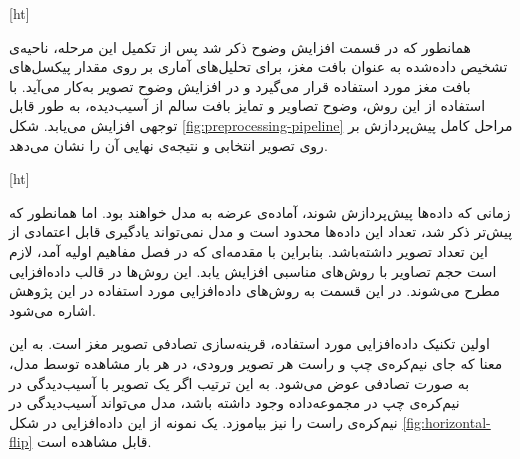 [ht]

همانطور که در قسمت افزایش وضوح ذکر شد پس از تکمیل این مرحله، ناحیه‌ی تشخیص داده‌شده به عنوان بافت مغز، برای تحلیل‌های آماری بر روی مقدار پیکسل‌های بافت مغز مورد استفاده قرار می‌گیرد و در افزایش وضوح تصویر به‌کار می‌آید.
با استفاده از این روش، وضوح تصاویر و تمایز بافت سالم از آسیب‌دیده، به طور قابل توجهی افزایش می‌یابد.
شکل \ref{fig:preprocessing-pipeline}
مراحل کامل پیش‌پردازش بر روی تصویر انتخابی و نتیجه‌ی نهایی آن را نشان می‌دهد.


[ht]



زمانی که داده‌ها پیش‌پردازش شوند، آماده‌ی عرضه به مدل خواهند بود.
اما همانطور که پیش‌تر ذکر شد، تعداد این داده‌ها محدود است و مدل نمی‌تواند یادگیری قابل اعتمادی از این تعداد تصویر داشته‌باشد.
بنابراین
 با مقدمه‌ای که در فصل مفاهیم اولیه آمد، لازم است حجم تصاویر با روش‌های مناسبی افزایش یابد.
 این روش‌ها در قالب داده‌افزایی مطرح می‌شوند.
 در این قسمت به روش‌های داده‌افزایی مورد استفاده در این پژوهش اشاره می‌شود.

 اولین تکنیک داده‌افزایی مورد استفاده، قرینه‌سازی تصادفی تصویر مغز است.
 به این معنا که جای نیم‌کره‌ی چپ و راست هر تصویر ورودی، در هر بار مشاهده توسط مدل، به صورت تصادفی
 عوض می‌شود.
 به این ترتیب اگر یک تصویر با آسیب‌دیدگی در نیم‌کره‌ی چپ در مجموعه‌داده وجود داشته باشد، مدل می‌تواند آسیب‌دیدگی در نیم‌کره‌ی راست را نیز بیاموزد.
 یک نمونه از این داده‌افزایی در شکل \ref{fig:horizontal-flip} قابل مشاهده است.

